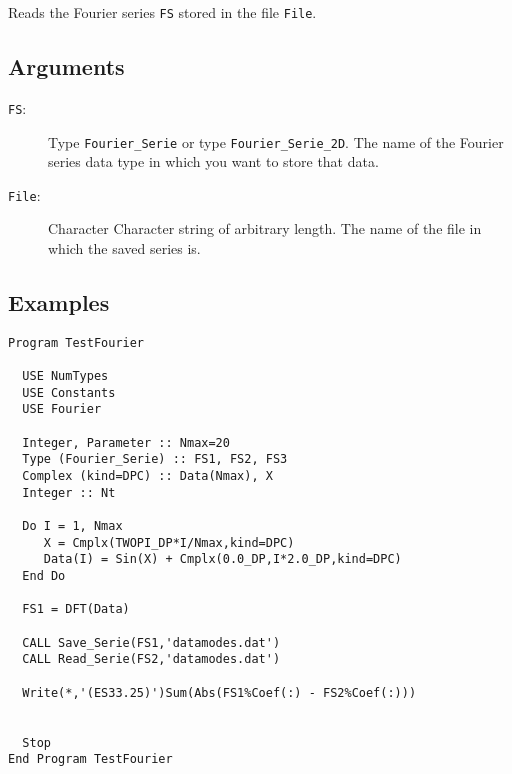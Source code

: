Reads the Fourier series \texttt{FS} stored in the file \texttt{File}.

\subsection{Arguments}

\begin{description}
\item[\texttt{FS}:] Type \texttt{Fourier\_Serie} or type
  \texttt{Fourier\_Serie\_2D}. The name of the Fourier series data
  type in which you want to store that data.
\item[\texttt{File}:] Character Character string of arbitrary
  length. The name of the file in which the saved series is.
\end{description}

\subsection{Examples}

\begin{verbatim}
Program TestFourier

  USE NumTypes
  USE Constants
  USE Fourier

  Integer, Parameter :: Nmax=20
  Type (Fourier_Serie) :: FS1, FS2, FS3
  Complex (kind=DPC) :: Data(Nmax), X
  Integer :: Nt

  Do I = 1, Nmax
     X = Cmplx(TWOPI_DP*I/Nmax,kind=DPC)
     Data(I) = Sin(X) + Cmplx(0.0_DP,I*2.0_DP,kind=DPC)
  End Do

  FS1 = DFT(Data)

  CALL Save_Serie(FS1,'datamodes.dat')
  CALL Read_Serie(FS2,'datamodes.dat')

  Write(*,'(ES33.25)')Sum(Abs(FS1%Coef(:) - FS2%Coef(:)))


  Stop
End Program TestFourier
\end{verbatim}

